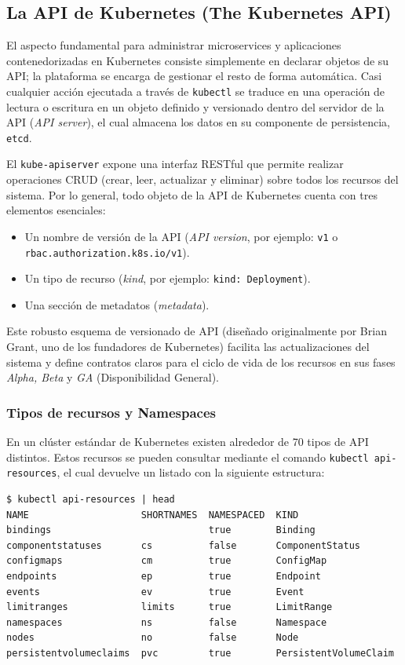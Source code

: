 \subsection{La API de Kubernetes (The Kubernetes API)}

El aspecto fundamental para administrar microservices y aplicaciones contenedorizadas en Kubernetes consiste simplemente en declarar objetos de su API; la plataforma se encarga de gestionar el resto de forma automática. Casi cualquier acción ejecutada a través de \texttt{kubectl} se traduce en una operación de lectura o escritura en un objeto definido y versionado dentro del servidor de la API (\textit{API server}), el cual almacena los datos en su componente de persistencia, \texttt{etcd}.

El \texttt{kube-apiserver} expone una interfaz RESTful que permite realizar operaciones CRUD (crear, leer, actualizar y eliminar) sobre todos los recursos del sistema. Por lo general, todo objeto de la API de Kubernetes cuenta con tres elementos esenciales:
\begin{itemize}
    \item Un nombre de versión de la API (\textit{API version}, por ejemplo: \texttt{v1} o \texttt{rbac.authorization.k8s.io/v1}).
    \item Un tipo de recurso (\textit{kind}, por ejemplo: \texttt{kind: Deployment}).
    \item Una sección de metadatos (\textit{metadata}).
\end{itemize}

Este robusto esquema de versionado de API (diseñado originalmente por Brian Grant, uno de los fundadores de Kubernetes) facilita las actualizaciones del sistema y define contratos claros para el ciclo de vida de los recursos en sus fases \textit{Alpha, Beta} y \textit{GA} (Disponibilidad General).

\subsubsection{Tipos de recursos y Namespaces}
En un clúster estándar de Kubernetes existen alrededor de 70 tipos de API distintos. Estos recursos se pueden consultar mediante el comando \texttt{kubectl api-resources}, el cual devuelve un listado con la siguiente estructura:

\begin{verbatim}
$ kubectl api-resources | head
NAME                    SHORTNAMES  NAMESPACED  KIND
bindings                            true        Binding
componentstatuses       cs          false       ComponentStatus
configmaps              cm          true        ConfigMap
endpoints               ep          true        Endpoint
events                  ev          true        Event
limitranges             limits      true        LimitRange
namespaces              ns          false       Namespace
nodes                   no          false       Node
persistentvolumeclaims  pvc         true        PersistentVolumeClaim
\end{verbatim}

